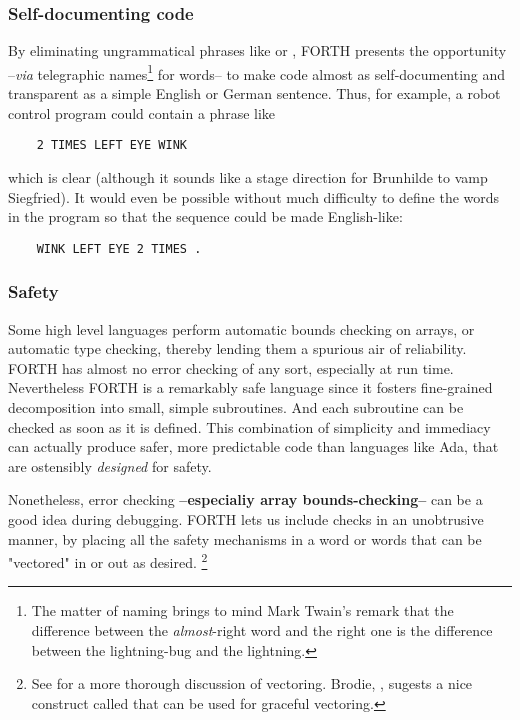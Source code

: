 \subsubsection{Self-documenting code}
By eliminating ungrammatical phrases like  or , FORTH presents the opportunity --\textit{via} telegraphic names\footnote{The matter of naming brings to mind Mark Twain's remark that the difference between the \textit{almost}-right word and the right one is the difference between the lightning-bug and the lightning.} for words-- to make code almost as self-documenting and transparent as a simple English or German sentence. Thus, for example, a robot control program could contain a phrase like

\begin{lstlisting}
    2 TIMES LEFT EYE WINK
\end{lstlisting}

which is clear (although it sounds like a stage direction for Brunhilde to vamp Siegfried). It would even be possible without much difficulty to define the words in the program so that the sequence could be made English-like:

\begin{lstlisting}
    WINK LEFT EYE 2 TIMES .
\end{lstlisting}

\subsubsection{Safety}

Some high level languages perform automatic bounds checking on arrays, or automatic type checking, thereby lending them a spurious air of reliability. FORTH has almost no error checking
of any sort, especially at run time. Nevertheless FORTH is a remarkably safe language since it fosters fine-grained decomposition into small, simple subroutines. And each subroutine can be checked as soon as it is defined. This combination of simplicity and immediacy can actually produce safer, more predictable code than languages like Ada, that are ostensibly \textit{designed} for safety.

\leftbar[1\linewidth]
Nonetheless, error checking \textbf{--especialiy array bounds-checking--} can be a good idea during debugging. FORTH lets us include checks in an unobtrusive manner, by placing all the safety mechanisms in a word or words that can be "vectored" in or out as desired.
\endleftbar \footnote{See \FTR for a more thorough discussion of vectoring. Brodie, \TF, sugests a nice construct called  that can be used for graceful vectoring.}
